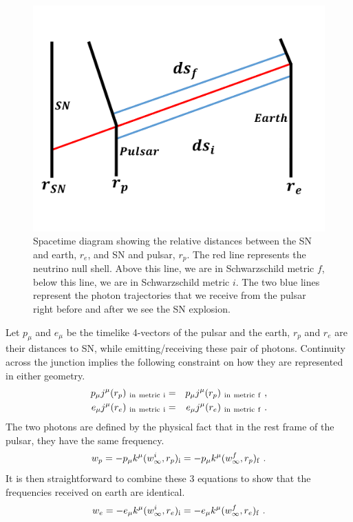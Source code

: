 \documentclass[aps,showpacs,onecolumn,floats,prd,superscriptaddress,nofootinbib]{revtex4}
\begin{document}
\begin{figure}[tb!]
\begin{center}
\includegraphics[scale = 0.3]{Image2.pdf}
\caption{Spacetime diagram showing the relative distances between the SN and earth, $r_e$, and SN and pulsar, $r_p$. The red line represents the neutrino null shell. Above this line, we are in Schwarzschild metric $f$, below this line, we are in Schwarzschild metric $i$. The two blue lines represent the photon trajectories that we receive from the pulsar right before and after we see the SN explosion.}
\label{fig:1}
\end{center}
\end{figure}

Let $p_\mu$ and $e_\mu$ be the timelike 4-vectors of the pulsar and the earth, $r_p$ and $r_e$ are their distances to SN, while emitting/receiving these pair of photons. Continuity across the junction implies the following constraint on how they are represented in either geometry.
\begin{eqnarray}
p_\mu j^\mu(r_p)_{\rm \ in \ metric \ i} &=& 
p_\mu j^\mu(r_p)_{\rm \ in \ metric \ f}~,
\label{eq-JuncPuls} \\ 
e_\mu j^\mu(r_e)_{\rm \ in \ metric \ i} &=& 
e_\mu j^\mu(r_e)_{\rm \ in \ metric \ f}~.
\end{eqnarray}
The two photons are defined by the physical fact that in the rest frame of the pulsar, they have the same frequency.
\begin{equation}
w_p = -p_\mu k^\mu(w^i_\infty, r_p)_{\rm i} = 
-p_\mu k^\mu(w^f_\infty, r_p)_{\rm f}~.
\label{eq-PulsEmit}
\end{equation}
It is then straightforward to combine these 3 equations to show that the frequencies received on earth are identical.
\begin{equation}
w_e = -e_\mu k^\mu(w^i_\infty, r_e)_{\rm i} = 
-e_\mu k^\mu(w^f_\infty, r_e)_{\rm f}~.
\end{equation}
\end{document}
